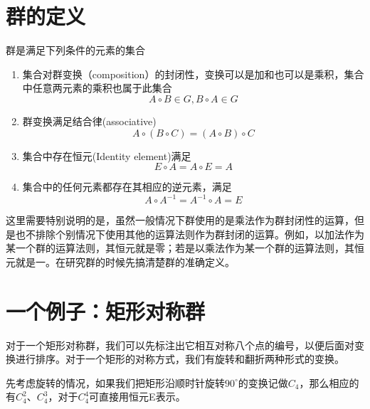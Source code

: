 \section{群的定义}
    群是满足下列条件的元素的集合
    \begin{enumerate}
        \item 集合对群变换（composition）的封闭性，变换可以是加和也可以是乘积，集合中任意两元素的乘积也属于此集合\[A \circ B \in G , B \circ A \in G\]
        \item 群变换满足结合律(associative)\[A \circ (B \circ C)=(A \circ B) \circ C\]
        \item 集合中存在恒元(Identity element)满足\[E \circ A = A \circ E = A\]
        \item 集合中的任何元素都存在其相应的逆元素，满足\[A \circ A^{-1} =  A^{-1} \circ A =E\]
    \end{enumerate}

    这里需要特别说明的是，虽然一般情况下群使用的是乘法作为群封闭性的运算，但是也不排除个别情况下使用其他的运算法则作为群封闭的运算。例如，以加法作为某一个群的运算法则，其恒元就是零；若是以乘法作为某一个群的运算法则，其恒元就是一。在研究群的时候先搞清楚群的准确定义。

\section{一个例子：矩形对称群}
    对于一个矩形对称群，我们可以先标注出它相互对称八个点的编号，以便后面对变换进行排序。对于一个矩形的对称方式，我们有旋转和翻折两种形式的变换。

    先考虑旋转的情况，如果我们把矩形沿顺时针旋转$90^\circ$的变换记做$C_4$，那么相应的有$C_4^2$、$C_4^3$，对于$C_4^4$可直接用恒元E表示。